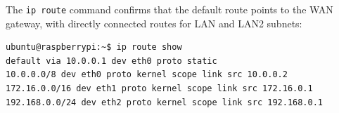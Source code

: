 The \texttt{ip route} command confirms that the default route points to the WAN gateway, with directly connected routes for LAN and LAN2 subnets:

\begin{verbatim}
ubuntu@raspberrypi:~$ ip route show
default via 10.0.0.1 dev eth0 proto static
10.0.0.0/8 dev eth0 proto kernel scope link src 10.0.0.2
172.16.0.0/16 dev eth1 proto kernel scope link src 172.16.0.1
192.168.0.0/24 dev eth2 proto kernel scope link src 192.168.0.1
\end{verbatim}